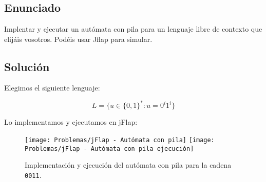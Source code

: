 \chapter{}

\section{Enunciado}

Implentar y ejecutar un autómata con pila para un lenguaje libre de contexto que elijáis vosotros.
Podéis usar Jflap para simular.

\section{Solución}

Elegimos el siguiente lenguaje:

\[L = \Big\{u \in {\{0,1\}}^* : u = 0^{i}1^{i}\Big\}\]

Lo implementamos y ejecutamos en jFlap:

\begin{figure}[h!]
\begin{center}
	\texttt{[image: Problemas/jFlap - Autómata con pila]}
	\texttt{[image: Problemas/jFlap - Autómata con pila ejecución]}
\caption{Implementación y ejecución del autómata con pila para la cadena \texttt{0011}.}
\end{center}
\end{figure}
